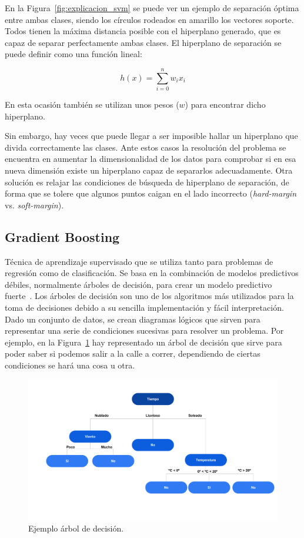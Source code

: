 \documentclass[a4paper, 12pt]{book}
\begin{document}
En la Figura~\ref{fig:explicacion_svm} se puede ver un ejemplo de separación óptima entre ambas clases, siendo los círculos rodeados en amarillo los vectores soporte. Todos tienen la máxima distancia posible con el hiperplano generado, que es capaz de separar perfectamente ambas clases. El hiperplano de separación se puede definir como una función lineal:

\begin{equation}
    h(x) = \sum_{i= 0}^{n} w_i x_i
\end{equation}

En esta ocasión también se utilizan unos pesos ($w$) para encontrar dicho hiperplano.

Sin embargo, hay veces que puede llegar a ser imposible hallar un hiperplano que divida correctamente las clases. Ante estos casos la resolución del problema se encuentra en aumentar la dimensionalidad de los datos para comprobar si en esa nueva dimensión existe un hiperplano capaz de separarlos adecuadamente. Otra solución es relajar las condiciones de búsqueda de hiperplano de separación, de forma que se tolere que algunos puntos caigan en el lado incorrecto (\textit{hard-margin} vs. \textit{soft-margin}).


\subsection{Gradient Boosting}
\label{subsec:gradient_boosting}

Técnica de aprendizaje supervisado que se utiliza tanto para problemas de regresión como de clasificación. Se basa en la combinación de modelos predictivos débiles, normalmente árboles de decisión, para crear un modelo predictivo fuerte~\cite{James2021}. Los árboles de decisión son uno de los algoritmos más utilizados para la toma de decisiones debido a su sencilla implementación y fácil interpretación. Dado un conjunto de datos, se crean diagramas lógicos que sirven para representar una serie de condiciones sucesivas para resolver un problema. Por ejemplo, en la Figura~\ref{fig:ejemplo_adecision} hay representado un árbol de decisión que sirve para poder saber si podemos salir a la calle a correr, dependiendo de ciertas condiciones se hará una cosa u otra. 

\begin{figure}[htb]
  \centering
  \includegraphics[width=16cm, keepaspectratio]{img/ejemplo_adecision.pdf}
  \caption{Ejemplo árbol de decisión.}\label{fig:ejemplo_adecision}
\end{figure}
\end{document}
